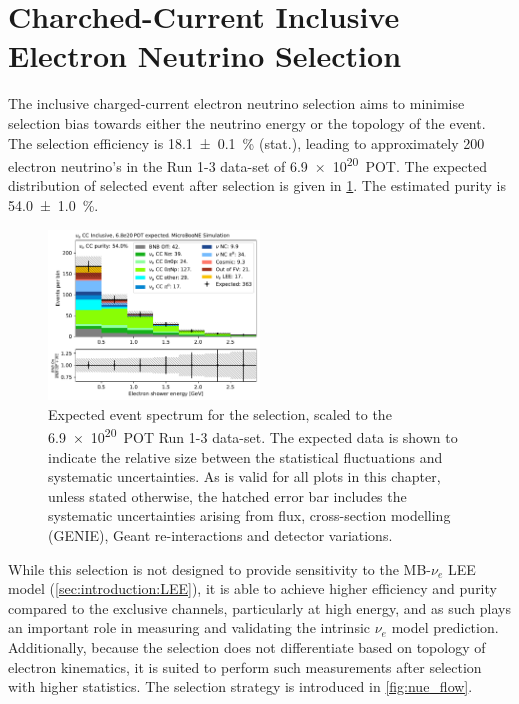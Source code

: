 \section{Charched-Current Inclusive Electron Neutrino Selection }
\label{sec:nueselection:inclusive}

\newcommand{\pct}[1]{\SI{#1}{\%}}
\newcommand{\syst}{systematic uncertainty\xspace}
\newcommand{\systs}{systematic uncertainties\xspace}
\newcommand{\unbpot}{\SI{5.5e19}{POT}\xspace}
\newcommand{\fullpot}{\SI{6.9e20}{POT}\xspace}

The inclusive charged-current electron neutrino selection aims to minimise selection bias towards either the neutrino energy or the topology of the event. The selection efficiency is \pct{18.1+-0.1} (stat.), leading to approximately 200 electron neutrino's in the Run 1-3 data-set of \fullpot. The expected distribution of selected event after selection is given in \cref{fig:nuecc:expected}. The estimated \nuecc purity is \pct{54.0+-1.0}.

\begin{figure}[H]
    \centering
    \includegraphics[width = 0.5\textwidth]{NueCCsel/Images/truth/intro_plot_scaled.pdf}
    \caption{Expected event spectrum for the \nuecc selection, scaled to the \fullpot Run 1-3 data-set. The expected data is shown to indicate the relative size between the statistical fluctuations and \systs. As is valid for all plots in this chapter, unless stated otherwise, the hatched error bar includes the systematic uncertainties arising from flux, cross-section modelling (GENIE), Geant re-interactions and detector variations.}
    \label{fig:nuecc:expected}
\end{figure}

While this selection is not designed to provide sensitivity to the MB-$\nu_e$ LEE model (\cref{sec:introduction:LEE}), it is able to achieve higher efficiency and purity compared to the exclusive channels, particularly at high energy, and as such plays an important role in measuring and validating the intrinsic $\nu_e$ model prediction. Additionally, because the selection does not differentiate based on topology of electron kinematics, it is suited to perform such measurements after selection with higher statistics. The selection strategy is introduced in \cref{fig:nue_flow}. 

